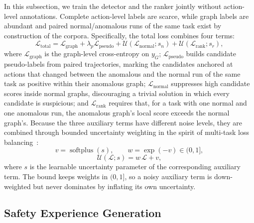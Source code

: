In this subsection, we train the detector and the ranker jointly without action-level annotations. Complete action-level labels are scarce, while graph labels are abundant and paired normal/anomalous runs of the same task exist by construction of the corpora. Specifically, the total loss combines four terms:
\begin{equation}
\mathcal{L}_{\mathrm{total}}
=\mathcal{L}_{\mathrm{graph}}
+\lambda_p\mathcal{L}_{\mathrm{pseudo}}
+\mathcal{U}(\mathcal{L}_{\mathrm{normal}};s_n)
+\mathcal{U}(\mathcal{L}_{\mathrm{rank}};s_r),
\label{eq:ltotal}
\end{equation}
where $\mathcal{L}_{\mathrm{graph}}$ is the graph-level cross-entropy on $y_G$; $\mathcal{L}_{\mathrm{pseudo}}$ builds candidate pseudo-labels from paired trajectories, marking the candidates anchored at actions that changed between the anomalous and the normal run of the same task as positive within their anomalous graph; $\mathcal{L}_{\mathrm{normal}}$ suppresses high candidate scores inside normal graphs, discouraging a trivial solution in which every candidate is suspicious; and $\mathcal{L}_{\mathrm{rank}}$ requires that, for a task with one normal and one anomalous run, the anomalous graph's local score exceeds the normal graph's. Because the three auxiliary terms have different noise levels, they are combined through bounded uncertainty weighting in the spirit of multi-task loss balancing~\cite{kendall2017multitask}:
\begin{equation}
v=\operatorname{softplus}(s),\qquad w=\exp(-v)\in(0,1],
\label{eq:uw}
\end{equation}
\begin{equation}
\mathcal{U}(\mathcal{L};s)=w\,\mathcal{L}+v,
\label{eq:uw2}
\end{equation}
where $s$ is the learnable uncertainty parameter of the corresponding auxiliary term. The bound keeps weights in $(0,1]$, so a noisy auxiliary term is down-weighted but never dominates by inflating its own uncertainty.

\subsection{Safety Experience Generation}
\label{sec:method-exp}

